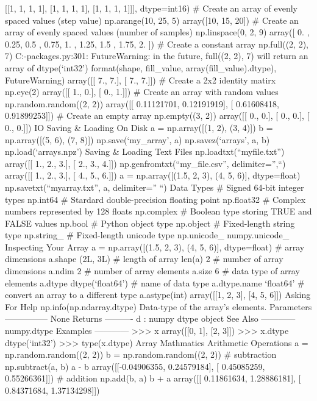            [[1, 1, 1, 1],
            [1, 1, 1, 1],
            [1, 1, 1, 1]]], dtype=int16)
# Create an array of evenly spaced values (step value)
np.arange(10, 25, 5)
array([10, 15, 20])
# Create an array of evenly spaced values (number of samples)
np.linspace(0, 2, 9)
array([ 0. , 0.25, 0.5 , 0.75, 1. , 1.25, 1.5 , 1.75, 2. ])
# Create a constant array
np.full((2, 2), 7)
C:\ProgramData{}\lib\site-packages\numpy\core\numeric.py:301: FutureWarning: in the future, full((2, 2), 7) will return an array of dtype(‘int32’) format(shape, fill_value, array(fill_value).dtype), FutureWarning) array([[ 7., 7.], [ 7., 7.]])
# Create a 2x2 identity matirx
np.eye(2)
array([[ 1., 0.], [ 0., 1.]])
# Create an array with random values
np.random.random((2, 2))
array([[ 0.11121701, 0.12191919], [ 0.61608418, 0.91899253]])
# Create an empty array
np.empty((3, 2))
array([[ 0., 0.], [ 0., 0.], [ 0., 0.]])
IO
Saving & Loading On Disk
a = np.array([(1, 2), (3, 4)])
b = np.array([(5, 6), (7, 8)])
np.save(‘my_array’, a)
np.savez(‘arrays’, a, b)
np.load(‘arrays.npz’)
Saving & Loading Text Files
np.loadtxt(“myfile.txt”)
array([[ 1., 2., 3.], [ 2., 3., 4.]])
np.genfromtxt(“my_file.csv”, delimiter=”,“)
array([[ 1., 2., 3.], [ 4., 5., 6.]])
a = np.array([(1.5, 2, 3), (4, 5, 6)], dtype=float)
np.savetxt(“myarray.txt”, a, delimiter=” “)
Data Types
# Signed 64-bit integer types
np.int64
# Stardard double-precision floating point
np.float32
# Complex numbers represented by 128 floats
np.complex
# Boolean type storing TRUE and FALSE values
np.bool
# Python object type
np.object
# Fixed-length string type
np.string_
# Fixed-length unicode type
np.unicode_
numpy.unicode_
Inspecting Your Array
a = np.array([(1.5, 2, 3), (4, 5, 6)], dtype=float)
# array dimensions
a.shape
(2L, 3L)
# length of array
len(a)
2
# number of array dimensions
a.ndim
2
# number of array elements
a.size
6
# data type of array elements
a.dtype
dtype(‘float64’)
# name of data type
a.dtype.name
‘float64’
# convert an array to a different type
a.astype(int)
array([[1, 2, 3], [4, 5, 6]])
Asking For Help
np.info(np.ndarray.dtype)
Data-type of the array’s elements. Parameters ————— None Returns ———- d : numpy dtype object See Also ———— numpy.dtype Examples ———— >>> x array([[0, 1], [2, 3]]) >>> x.dtype dtype(‘int32’) >>> type(x.dtype)
Array Mathmatics
Arithmetic Operations
a = np.random.random((2, 2))
b = np.random.random((2, 2))
# subtraction
np.subtract(a, b)
a - b
array([[-0.04906355, 0.24579184], [ 0.45085259, 0.55266361]])
# addition
np.add(b, a)
b + a
array([[ 0.11861634, 1.28886181], [ 0.84371684, 1.37134298]])
